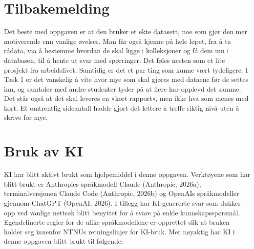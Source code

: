 \documentclass[11pt,a4paper]{article}
\begin{document}
\section{Tilbakemelding}
Det beste med oppgaven er at den bruker et ekte datasett, noe som gjør den mer motiverende enn vanlige øvelser. Man får også kjenne på hele løpet, fra å ta rådata, via å bestemme hvordan de skal ligge i kolleksjoner og få dem inn i databasen, til å hente ut svar med spørringer. Det føles nesten som et lite prosjekt fra arbeidslivet. Samtidig er det et par ting som kunne vært tydeligere. I Task 1 er det vanskelig å vite hvor mye som skal gjøres med dataene før de settes inn, og samtaler med andre studenter tyder på at flere har opplevd det samme. Det står også at det skal leveres en «kort rapport», men ikke hva som menes med kort. Et omtrentlig sideantall hadde gjort det lettere å treffe riktig nivå uten å skrive for mye.

\section{Bruk av KI}
KI har blitt aktivt brukt som hjelpemiddel i denne oppgaven. Verktøyene som
har blitt brukt er Anthropics språkmodell Claude (Anthropic, 2026a),
terminalversjonen Claude Code (Anthropic, 2026b) og OpenAIs språkmodeller
gjennom ChatGPT (OpenAI, 2026). I tillegg har KI-genererte svar som dukker
opp ved vanlige nettsøk blitt benyttet for å svare på enkle
kunnskapsspørsmål. Egendefinerte regler for de ulike språkmodellene er
opprettet slik at bruken holder seg innenfor NTNUs retningslinjer for
KI-bruk. Mer nøyaktig har KI i denne oppgaven blitt brukt til følgende:
\end{document}

